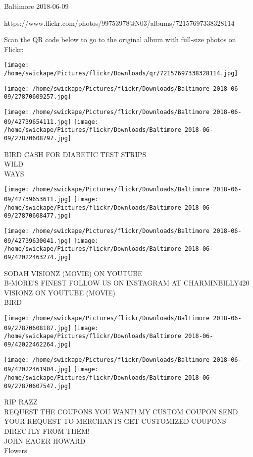 \documentclass[10pt,letterpaper]{article}
\begin{document}
Baltimore 2018-06-09

https://www.flickr.com/photos/99753978@N03/albums/72157697338328114

Scan the QR code below to go to the original album with full-size photos on Flickr:

\texttt{[image: /home/swickape/Pictures/flickr/Downloads/qr/72157697338328114.jpg]}
\pagebreak

\texttt{[image: /home/swickape/Pictures/flickr/Downloads/Baltimore 2018-06-09/27870609257.jpg]}

\vspace{0.25in}
\texttt{[image: /home/swickape/Pictures/flickr/Downloads/Baltimore 2018-06-09/42739654111.jpg]}
\texttt{[image: /home/swickape/Pictures/flickr/Downloads/Baltimore 2018-06-09/27870608797.jpg]}

BIRD CASH FOR DIABETIC TEST STRIPS\\
WILD\\
WAYS
\pagebreak

\texttt{[image: /home/swickape/Pictures/flickr/Downloads/Baltimore 2018-06-09/42739653611.jpg]}
\texttt{[image: /home/swickape/Pictures/flickr/Downloads/Baltimore 2018-06-09/27870608477.jpg]}

\texttt{[image: /home/swickape/Pictures/flickr/Downloads/Baltimore 2018-06-09/42739630041.jpg]}
\texttt{[image: /home/swickape/Pictures/flickr/Downloads/Baltimore 2018-06-09/42022463274.jpg]}

SODAH VISIONZ (MOVIE) ON YOUTUBE\\
B{-}MORE'S FINEST FOLLOW US ON INSTAGRAM AT CHARMINBILLY420\\
VISIONZ ON YOUTUBE (MOVIE)\\
BIRD
\pagebreak

\texttt{[image: /home/swickape/Pictures/flickr/Downloads/Baltimore 2018-06-09/27870608187.jpg]}
\texttt{[image: /home/swickape/Pictures/flickr/Downloads/Baltimore 2018-06-09/42022462264.jpg]}

\texttt{[image: /home/swickape/Pictures/flickr/Downloads/Baltimore 2018-06-09/42022461904.jpg]}
\texttt{[image: /home/swickape/Pictures/flickr/Downloads/Baltimore 2018-06-09/27870607547.jpg]}

RIP RAZZ\\
REQUEST THE COUPONS YOU WANT!  MY CUSTOM COUPON SEND YOUR REQUEST TO MERCHANTS GET CUSTOMIZED COUPONS DIRECTLY FROM THEM!\\
JOHN EAGER HOWARD\\
Flowers
\pagebreak
\end{document}
